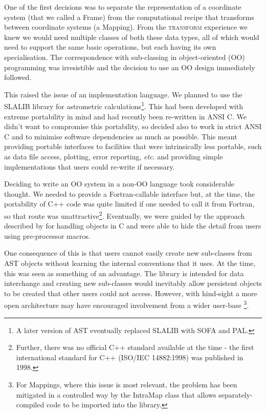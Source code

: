 \documentclass[final,authoryear,5p,times,twocolumn]{elsarticle}
\begin{document}
One of the first decisions was to
separate the representation of a coordinate system (that we called a
Frame) from the computational recipe that transforms between
coordinate systems (a Mapping). From the \textsc{transform} experience
we knew we would need multiple classes of both these data types, all
of which would need to support the same basic operations, but each
having its own specialisation. The correspondence with sub-classing in
object-oriented (OO) programming was irresistible and the decision to
use an OO design immediately followed.

This raised the issue of an implementation language. We planned to use
the SLALIB library for astrometric calculations\footnote{A later version
of AST eventually replaced SLALIB with SOFA and PAL.}. This had been
developed with extreme portability in mind and had recently been
re-written in ANSI C. We didn't want to compromise this portability,
so decided also to work in strict ANSI C and to minimise software
dependencies as much as possible. This meant providing portable
interfaces to facilities that were intrinsically less portable, such
as data file access, plotting, error reporting, \emph{etc}. and providing
simple implementations that users could re-write if necessary.

Deciding to write an OO system in a non-OO language took considerable
thought. We needed to provide a Fortran-callable interface but, at the
time, the portability of C++ code was quite limited if one needed to
call it from Fortran, so that route was unattractive\footnote{Further, there
was no official C++ standard available at the time - the first international
standard for C++ (ISO/IEC 14882:1998) was published in 1998.}. Eventually, we
were guided by the approach described by \citet{1992Holub} for
handling objects in C and were able to hide the detail from users
using pre-processor macros.

One consequence of this is that users cannot easily create new
sub-classes from AST objects without learning the internal conventions
that it uses. At the time, this was seen as something of an advantage.
The library is intended for data interchange and creating new
sub-classes would inevitably allow persistent objects to be created
that other users could not access. However, with hind-sight a more open
architecture may have encouraged involvement from a wider user-base
\footnote{For Mappings, where this
  issue is most relevant, the problem has been mitigated in a
  controlled way by the IntraMap class that allows separately-compiled
  code to be imported into the library.}.
\end{document}
